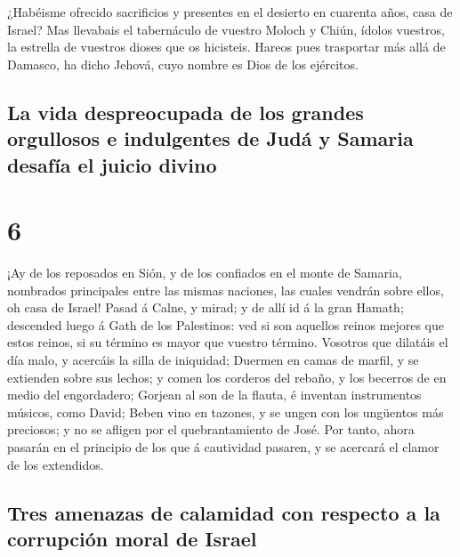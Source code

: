  ¿Habéisme ofrecido sacrificios y presentes en el
desierto en cuarenta años, casa de Israel?  Mas llevabais
el tabernáculo de vuestro Moloch y Chiún, ídolos vuestros, la estrella
de vuestros dioses que os hicisteis.  Hareos pues
trasportar más allá de Damasco, ha dicho Jehová, cuyo nombre es Dios de
los ejércitos.

\hypertarget{la-vida-despreocupada-de-los-grandes-orgullosos-e-indulgentes-de-juduxe1-y-samaria-desafuxeda-el-juicio-divino}{%
\subsection{La vida despreocupada de los grandes orgullosos e
indulgentes de Judá y Samaria desafía el juicio
divino}\label{la-vida-despreocupada-de-los-grandes-orgullosos-e-indulgentes-de-juduxe1-y-samaria-desafuxeda-el-juicio-divino}}

\hypertarget{section-5}{%
\section{6}\label{section-5}}

 ¡Ay de los reposados en Sión, y de los confiados en el
monte de Samaria, nombrados principales entre las mismas naciones, las
cuales vendrán sobre ellos, oh casa de Israel!  Pasad á
Calne, y mirad; y de allí id á la gran Hamath; descended luego á Gath de
los Palestinos: ved si son aquellos reinos mejores que estos reinos, si
su término es mayor que vuestro término.  Vosotros que
dilatáis el día malo, y acercáis la silla de iniquidad; 
Duermen en camas de marfil, y se extienden sobre sus lechos; y comen los
corderos del rebaño, y los becerros de en medio del engordadero;
 Gorjean al son de la flauta, é inventan instrumentos
músicos, como David;  Beben vino en tazones, y se ungen
con los ungüentos más preciosos; y no se afligen por el quebrantamiento
de José.  Por tanto, ahora pasarán en el principio de los
que á cautividad pasaren, y se acercará el clamor de los extendidos.

\hypertarget{tres-amenazas-de-calamidad-con-respecto-a-la-corrupciuxf3n-moral-de-israel}{%
\subsection{Tres amenazas de calamidad con respecto a la corrupción
moral de
Israel}\label{tres-amenazas-de-calamidad-con-respecto-a-la-corrupciuxf3n-moral-de-israel}}

